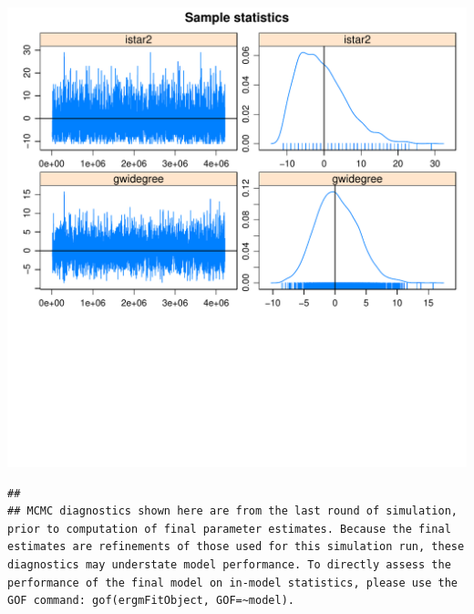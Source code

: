 \documentclass[12pt, letterpaper, notitlepage, onecolumn, twoside, openbib]{article}\usepackage[]{graphicx}\usepackage[]{color}
\makeatletter
\def\maxwidth{ %
  \ifdim\Gin@nat@width>\linewidth
    \linewidth
  \else
    \Gin@nat@width
  \fi
}
\newenvironment{kframe}{%
 \def\at@end@of@kframe{}%
 \ifinner\ifhmode%
  \def\at@end@of@kframe{\end{minipage}}%
  \begin{minipage}{\columnwidth}%
 \fi\fi%
 \def\FrameCommand##1{\hskip\@totalleftmargin \hskip-\fboxsep
 \colorbox{shadecolor}{##1}\hskip-\fboxsep
     \hskip-\linewidth \hskip-\@totalleftmargin \hskip\columnwidth}%
 \MakeFramed {\advance\hsize-\width
   \@totalleftmargin\z@ \linewidth\hsize
   \@setminipage}}%
 {\par\unskip\endMakeFramed%
 \at@end@of@kframe}
\newenvironment{knitrout}{}{} %
\makeatother
\begin{document}
\begin{knitrout}
\includegraphics[width=\maxwidth]{figure/unnamed-chunk-9-2} 
\begin{kframe}\begin{verbatim}
## 
## MCMC diagnostics shown here are from the last round of simulation, prior to computation of final parameter estimates. Because the final estimates are refinements of those used for this simulation run, these diagnostics may understate model performance. To directly assess the performance of the final model on in-model statistics, please use the GOF command: gof(ergmFitObject, GOF=~model).
\end{verbatim}
\end{kframe}
\end{knitrout}
\end{document}
